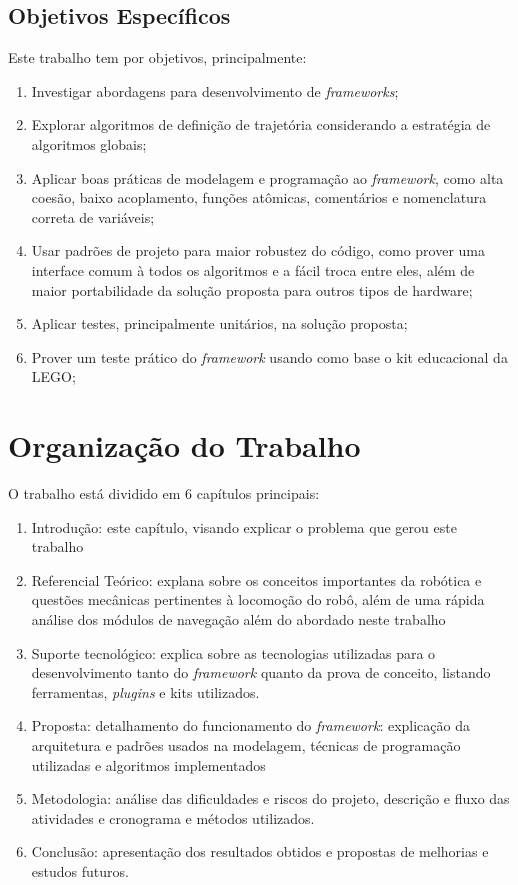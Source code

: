 \subsection{Objetivos Específicos}

Este trabalho tem por objetivos, principalmente:
\begin{enumerate}
	\item Investigar abordagens para desenvolvimento de \textit{frameworks};
	\item Explorar algoritmos de definição de trajetória considerando a estratégia de algoritmos globais;
	\item Aplicar boas práticas de modelagem e programação ao \textit{framework}, como alta coesão, baixo acoplamento, funções atômicas, comentários e nomenclatura correta de variáveis;
	\item Usar padrões de projeto para maior robustez do código, como prover uma interface comum à todos os algoritmos e a fácil troca entre eles, além de maior portabilidade da solução proposta para outros tipos de hardware;
	\item Aplicar testes, principalmente unitários, na solução proposta;
	\item Prover um teste prático do \textit{framework} usando como base o kit educacional da LEGO;
\end{enumerate}

\section{Organização do Trabalho}

O trabalho está dividido em 6 capítulos principais:
\begin{enumerate}
	\item Introdução: este capítulo, visando explicar o problema que gerou este trabalho
	\item Referencial Teórico: explana sobre os conceitos importantes da robótica e questões mecânicas pertinentes à locomoção do robô, além de uma rápida análise dos módulos de navegação além do abordado neste trabalho
	\item Suporte tecnológico: explica sobre as tecnologias utilizadas para o desenvolvimento tanto do \textit{framework} quanto da prova de conceito, listando ferramentas, \textit{plugins} e kits utilizados.	
	\item Proposta: detalhamento do funcionamento do \textit{framework}: explicação da arquitetura e padrões usados na modelagem, técnicas de programação utilizadas e algoritmos implementados
	\item Metodologia: análise das dificuldades e riscos do projeto, descrição e fluxo das atividades e cronograma e métodos utilizados.
	\item Conclusão: apresentação dos resultados obtidos e propostas de melhorias e estudos futuros.
\end{enumerate}
